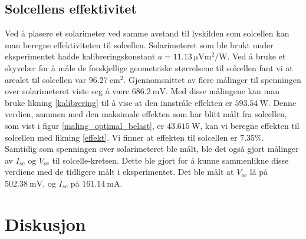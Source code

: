 \documentclass[%
 reprint,
 amsmath,amssymb,
 aps,
 norsk,
 booktabs
]{revtex4-1}
\begin{document}
\subsection{Solcellens effektivitet}
Ved å plasere et solarimeter ved samme avstand til lyskilden som solcellen kan man beregne effektiviteten til solcellen. Solarimeteret som ble brukt under eksperimentet hadde kalibreringskonstant $a=\SI{11.13}{\micro\volt\meter^2\per\watt}$. Ved å bruke et skyvelær for å måle de forskjellige geometriske størrelsene til solcellen fant vi at arealet til solcellen var $\SI{96.27}{\centi\meter^2}$. Gjennomsnittet av flere målinger til spenningen over solarimeteret viste seg å være $\SI{686.2}{\milli\volt}$. Med disse målingene kan man bruke likning \eqref{kalibrering} til å vise at den innstråle effekten er
$\SI{593.54}{\watt}$. Denne verdien, sammen med den maksimale effekten som har blitt målt fra solcellen, som vist i figur \vref{maling_optimal_belast}, er $\SI{43.615}{\watt}$, kan vi beregne effekten til solcellen med likning \eqref{effekt}. Vi finner at effekten til solcellen er $7.35\%$.\\Samtidig som spenningen over solarimeteret ble målt, ble det også gjort målinger av $I_{sc}$ og $V_{oc}$ til solcelle-kretsen. Dette ble gjort for å kunne sammenlikne disse verdiene med de tidligere målt i eksperimentet. Det ble målt at
$V_{oc}$ lå på $\SI{502.38}{\milli\volt}$, og $I_{sc}$ på $\SI{161.14}{\milli\ampere}$.
\section{Diskusjon}
\end{document}

